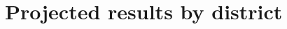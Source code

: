 \documentclass[12pt]{article}
\begin{document}




\appendix
\section{Projected results by district}
\label{sec:district_res}

\end{document}
